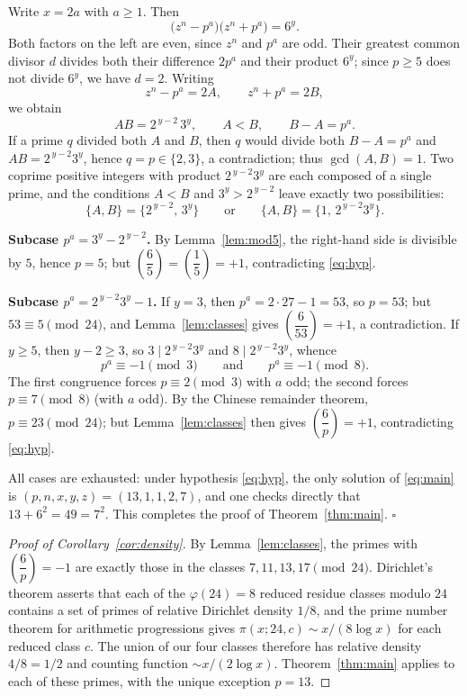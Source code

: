\documentclass[preprint,12pt]{elsarticle}
\theoremstyle{definition}
\newcommand{\leg}[2]{\left(\dfrac{#1}{#2}\right)}
\begin{document}
Write $x=2a$ with $a\geq 1$. Then
\[
\bigl(z^{n}-p^{a}\bigr)\bigl(z^{n}+p^{a}\bigr)=6^{y}.
\]
Both factors on the left are even, since $z^{n}$ and $p^{a}$ are odd. Their
greatest common divisor $d$ divides both their difference $2p^{a}$ and their
product $6^{y}$; since $p\geq 5$ does not divide $6^{y}$, we have $d=2$.
Writing
\[
z^{n}-p^{a}=2A,\qquad z^{n}+p^{a}=2B,
\]
we obtain
\[
AB=2^{\,y-2}\,3^{y},\qquad A<B,\qquad B-A=p^{a}.
\]
If a prime $q$ divided both $A$ and $B$, then $q$ would divide both
$B-A=p^{a}$ and $AB=2^{\,y-2}3^{y}$, hence $q=p\in\{2,3\}$, a contradiction;
thus $\gcd(A,B)=1$. Two coprime positive integers with product
$2^{\,y-2}3^{y}$ are each composed of a single prime, and the conditions
$A<B$ and $3^{y}>2^{\,y-2}$ leave exactly two possibilities:
\[
\{A,B\}=\bigl\{2^{\,y-2},\,3^{y}\bigr\}
\qquad\text{or}\qquad
\{A,B\}=\bigl\{1,\,2^{\,y-2}3^{y}\bigr\}.
\]

\medskip
\noindent\textbf{Subcase $p^{a}=3^{y}-2^{\,y-2}$.} By
Lemma~\ref{lem:mod5}, the right-hand side is divisible by $5$, hence
$p=5$; but $\leg{6}{5}=\leg{1}{5}=+1$, contradicting \eqref{eq:hyp}.

\medskip
\noindent\textbf{Subcase $p^{a}=2^{\,y-2}3^{y}-1$.} If $y=3$, then
$p^{a}=2\cdot 27-1=53$, so $p=53$; but $53\equiv 5\pmod{24}$, and
Lemma~\ref{lem:classes} gives $\leg{6}{53}=+1$, a contradiction. If
$y\geq 5$, then $y-2\geq 3$, so $3\mid 2^{\,y-2}3^{y}$ and
$8\mid 2^{\,y-2}3^{y}$, whence
\[
p^{a}\equiv -1\pmod 3
\qquad\text{and}\qquad
p^{a}\equiv -1\pmod 8.
\]
The first congruence forces $p\equiv 2\pmod 3$ with $a$ odd; the second
forces $p\equiv 7\pmod 8$ (with $a$ odd). By the Chinese remainder theorem,
$p\equiv 23\pmod{24}$; but Lemma~\ref{lem:classes} then gives
$\leg{6}{p}=+1$, contradicting \eqref{eq:hyp}.

\medskip
All cases are exhausted: under hypothesis \eqref{eq:hyp}, the only solution
of \eqref{eq:main} is $(p,n,x,y,z)=(13,1,1,2,7)$, and one checks directly
that $13+6^{2}=49=7^{2}$. This completes the proof of
Theorem~\ref{thm:main}. \hfill$\square$

\begin{proof}[Proof of Corollary~\ref{cor:density}]
By Lemma~\ref{lem:classes}, the primes with $\leg{6}{p}=-1$ are exactly those
in the classes $7,11,13,17\pmod{24}$. Dirichlet's theorem
\cite{Apostol1976} asserts that each of the $\varphi(24)=8$ reduced residue
classes modulo $24$ contains a set of primes of relative Dirichlet density
$1/8$, and the prime number theorem for arithmetic progressions gives
$\pi(x;24,c)\sim x/(8\log x)$ for each reduced class $c$. The union of our
four classes therefore has relative density $4/8=1/2$ and counting function
$\sim x/(2\log x)$. Theorem~\ref{thm:main} applies to each of these primes,
with the unique exception $p=13$.
\end{proof}
\end{document}
